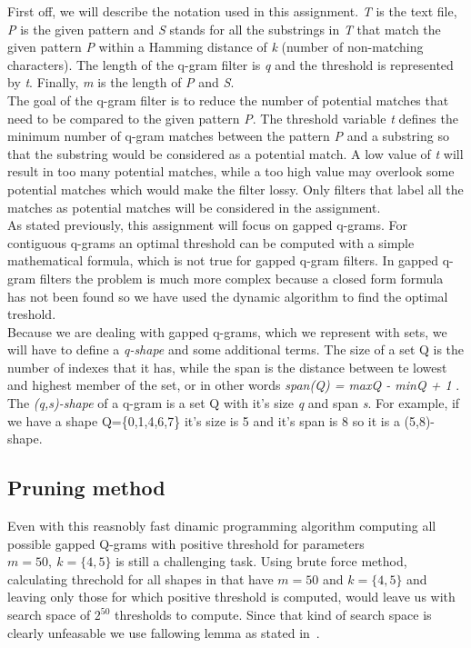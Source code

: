 \documentclass[paper=a4, fontsize=11pt]{scrartcl} %
\numberwithin{equation}{section} %
\numberwithin{figure}{section} %
\numberwithin{table}{section} %
\begin{document}
First off, we will describe the notation used in this assignment. \textit{T} is the text file, \textit{P} is the given pattern and \textit{S} stands 
for all the substrings in \textit{T} that match the given pattern \textit{P} within a Hamming distance of \textit{k} (number of non-matching characters). 
The length of the q-gram filter is \textit{q} and the threshold is represented by \textit{t}. Finally, \textit{m} is the length of \textit{P} and \textit{S}. \\
The goal of the q-gram filter is to reduce the number of potential matches that need to be compared to the given pattern \textit{P}. 
The threshold variable \textit{t} defines the minimum number of q-gram matches between the pattern \textit{P} and 
a substring so that the substring would be considered as a potential match. A low value of \textit{t} will result in too many potential matches, 
while a too high value may overlook some potential matches which would make the filter lossy. Only filters that label all the matches as 
potential matches will be considered in the assignment.\\
As stated previously, this assignment will focus on gapped q-grams. For contiguous q-grams an optimal threshold can be computed with a
simple mathematical formula, which is not true for gapped q-gram filters. In gapped q-gram filters the problem is much more complex
because a closed form formula has not been found so we have used the dynamic algorithm to find the optimal treshold.\\
Because we are dealing with gapped q-grams, which we represent with sets, we will have to define a \textit{q-shape} and
 some additional terms. The size of a set Q is the number of indexes that it has, while the span is the distance between te lowest
and highest member of the set, or in other words \textit{span(Q) = maxQ - minQ + 1} . The \textit{(q,s)-shape} of a q-gram is a set Q with it's
size \textit{q} and span \textit{s}. For example, if we have a shape Q=\{0,1,4,6,7\} it's size is 5 and it's span is 8 so it is a (5,8)-shape.




\subsection{Pruning method}

Even with this reasnobly fast dinamic programming algorithm computing all possible gapped Q-grams with positive threshold for parameters $m=50,\ k=\{4,5\}$ is still a challenging task. Using brute force method, calculating threchold for all shapes in that have $m=50$ and $k=\{4,5\}$ and leaving only those for which positive threshold is computed, would leave us with search space of $2^{50}$ thresholds to compute. Since that kind of search space is clearly unfeasable we use fallowing lemma as
stated in~\cite{njihovPaper}. 
\end{document}
